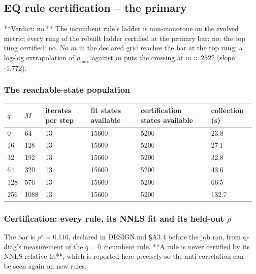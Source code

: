\documentclass[11pt]{article}
\begin{document}
\subsection{EQ rule certification -- the primary}
**Verdict: no.** The incumbent rule's ladder is non-monotone on the evolved metric; every rung of the rebuilt ladder certified at the primary bar: no; the top rung certified: no. No $m$ in the declared grid reaches the bar at the top rung; a log-log extrapolation of $\rho_{\max}$ against $m$ puts the crossing at $m \approx 2522$ (slope -1.772).

\subsubsection{The reachable-state population}
\begin{table}[htbp]\centering\small
\begin{tabular}{llllll}\hline
$q$ & $M$ & iterates per step & fit states available & certification states available & collection (s) \\ \hline
0 & 64 & 13 & 15600 & 5200 & 23.8 \\
16 & 128 & 13 & 15600 & 5200 & 27.1 \\
32 & 192 & 13 & 15600 & 5200 & 32.8 \\
64 & 320 & 13 & 15600 & 5200 & 43.6 \\
128 & 576 & 13 & 15600 & 5200 & 66.5 \\
256 & 1088 & 13 & 15600 & 5200 & 132.7 \\
\hline\end{tabular}
\end{table}
\subsubsection{Certification: every rule, its NNLS fit and its held-out $\rho$}
The bar is $\rho^\star = 0.116$, declared in DESIGN.md §A3.4 before the job ran, from q-diag's measurement of the $q=0$ incumbent rule. **A rule is never certified by its NNLS relative fit**, which is reported here precisely so the anti-correlation can be seen again on new rules.
\end{document}
